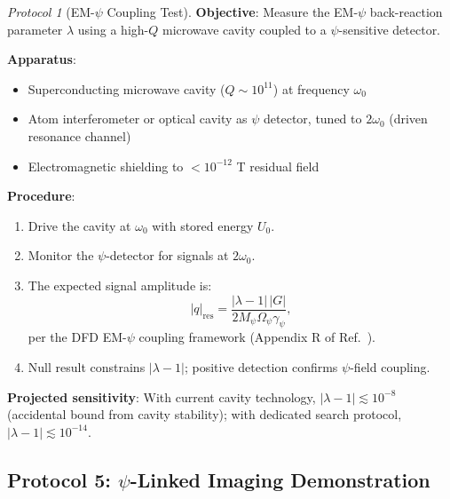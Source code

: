 \documentclass[12pt,a4paper]{article}
\theoremstyle{remark}
\newtheorem{protocol}{Protocol}
\begin{document}
\begin{protocol}[EM-$\psi$ Coupling Test]\label{prot:em-coupling}
\textbf{Objective}: Measure the EM-$\psi$ back-reaction parameter $\lambda$
using a high-$Q$ microwave cavity coupled to a $\psi$-sensitive detector.

\textbf{Apparatus}:
\begin{itemize}
\item Superconducting microwave cavity ($Q \sim 10^{11}$) at frequency
$\omega_0$
\item Atom interferometer or optical cavity as $\psi$ detector, tuned to
$2\omega_0$ (driven resonance channel)
\item Electromagnetic shielding to $< 10^{-12}$ T residual field
\end{itemize}

\textbf{Procedure}:
\begin{enumerate}
\item Drive the cavity at $\omega_0$ with stored energy $U_0$.
\item Monitor the $\psi$-detector for signals at $2\omega_0$.
\item The expected signal amplitude is:
\begin{equation}
|q|_{\text{res}} = \frac{|\lambda - 1|\,|G|}{2M_\psi\Omega_\psi\gamma_\psi},
\end{equation}
per the DFD EM-$\psi$ coupling framework (Appendix R of Ref.~\cite{Alcock2025DFD}).
\item Null result constrains $|\lambda - 1|$; positive detection confirms
$\psi$-field coupling.
\end{enumerate}

\textbf{Projected sensitivity}: With current cavity technology,
$|\lambda - 1| \lesssim 10^{-8}$ (accidental bound from cavity stability);
with dedicated search protocol, $|\lambda - 1| \lesssim 10^{-14}$.
\end{protocol}

\subsection{Protocol 5: $\psi$-Linked Imaging Demonstration}
\end{document}
